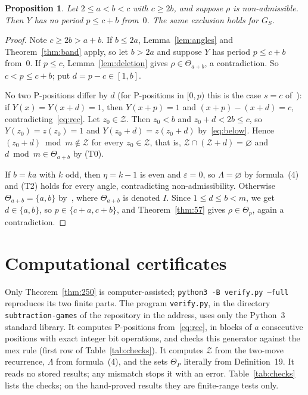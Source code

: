 \documentclass[11pt]{amsart}
\newtheorem{proposition}[theorem]{Proposition}
\theoremstyle{definition}
\numberwithin{equation}{section}
\newcommand{\Z}{\mathcal{Z}}
\newcommand{\Th}[1]{\Theta_{#1}}
\begin{document}
\begin{proposition}\label{prop:cb}
Let $2\le a<b<c$ with $c\ge 2b$, and suppose $\rho$ is non-admissible. Then $Y$ has no
period $p\le c+b$ from~$0$. The same exclusion holds for $G_S$.
\end{proposition}

\begin{proof}
Note $c\ge2b>a+b$. If $b\le2a$, Lemma~\ref{lem:angles} and Theorem~\ref{thm:band} apply, so let $b>2a$ and suppose
$Y$ has period $p\le c+b$ from~$0$. If $p\le c$, Lemma~\ref{lem:deletion} gives
$\rho\in\Th{a+b}$, a contradiction. So $c<p\le c+b$; put $d=p-c\in[1,b]$.

No two P-positions differ by $d$ (for P-positions in $[0,p)$ this is the case $s=c$
of~\cite[Lemma~2.3]{Levinstein}): if $Y(x)=Y(x+d)=1$, then $Y(x+p)=1$ and
$(x+p)-(x+d)=c$, contradicting~\eqref{eq:rec}. Let $z_0\in\Z$. Then $z_0<b$ and
$z_0+d<2b\le c$, so $Y(z_0)=z(z_0)=1$ and $Y(z_0+d)=z(z_0+d)$ by~\eqref{eq:below}. Hence
$(z_0+d)\bmod m\notin\Z$ for every $z_0\in\Z$, that is, $\Z\cap(\Z+d)=\varnothing$ and
$d\bmod m\in\Th{a+b}$ by (T0).

If $b=ka$ with $k$ odd, then $\eta=k-1$ is even and $\varepsilon=0$, so $\Lambda=\varnothing$
by formula~(4) and (T2) holds for every angle, contradicting non-admissibility. Otherwise
$\Th{a+b}=\{a,b\}$ by~\cite[Lemma~14]{Manabe}, where $\Th{a+b}$ is denoted $I$. Since
$1\le d\le b<m$, we get $d\in\{a,b\}$, so $p\in\{c+a,c+b\}$, and Theorem~\ref{thm:57} gives
$\rho\in\Th{p}$, again a contradiction.
\end{proof}

\section{Computational certificates}\label{sec:cert}

Only Theorem~\ref{thm:250} is computer-assisted; \texttt{python3 -B verify.py --full}
reproduces its two finite parts. The program \texttt{verify.py}, in the directory
\texttt{subtraction-games} of the repository in the address, uses only the Python~3
standard library. It computes P-positions from~\eqref{eq:rec}, in blocks of $a$ consecutive positions with
exact integer bit operations, and checks this generator against the mex rule (first row of
Table~\ref{tab:checks}). It computes $\Z$ from the two-move recurrence, $\Lambda$ from
formula~(4), and the sets $\Th{P}$ literally from Definition~19. It reads no stored results;
any mismatch stops it with an error. Table~\ref{tab:checks} lists the checks; on the
hand-proved results they are finite-range tests only.
\end{document}
